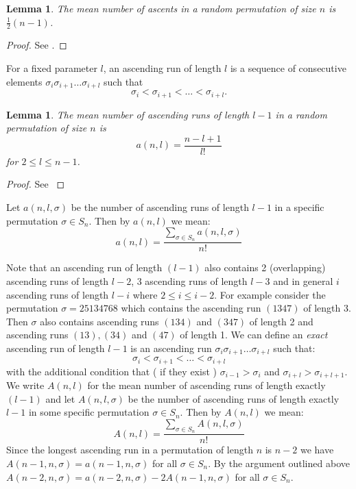\documentclass[oneside]{book} %
\newtheorem{lem}[thm]{Lemma}
\theoremstyle{definition}
\numberwithin{equation}{section}
\begin{document}
\begin{lem}\label{lem:ascents}
 The mean number of ascents in a random permutation of size $n$ is $\frac{1}{2}(n-1)$.
\end{lem}
\begin{proof}
 See \cite{Flajolet}.
\end{proof}

For a fixed parameter $l$, an ascending run of length $l$ is a sequence of consecutive elements 
$\sigma_i\sigma_{i+1}\dots\sigma_{i+l}$ such that 
\[
 \sigma_i < \sigma_{i+1} < \dots < \sigma_{i+l}.
\]

\begin{lem}\label{lem:ascendingruns}
 The mean number of ascending runs of length $l-1$ in a random permutation of size $n$ is 
 \[
  a(n,l) = \frac{n-l+1}{l!}
 \]
for $2 \leq l \leq n-1$.
\end{lem}
\begin{proof}
 See \cite{Flajolet}
\end{proof}
Let $a(n,l,\sigma)$ be the number of ascending runs of length $l-1$ in a specific permutation $\sigma \in S_n$.  Then by $a(n,l)$ we mean:
\[
 a(n,l) = \frac{\sum_{\sigma \in S_n}a(n,l,\sigma)}{n!}
\]


Note that an ascending run of length $(l-1)$ also contains 2 (overlapping) ascending runs of length $l-2$,
3 ascending runs of length $l-3$ and in general $i$ ascending runs of length $l-i$ where $ 2 \leq i\leq i-2 $.   For example consider the permutation $\sigma  = 25134768$ which contains the ascending run $(1347)$ of length 3.  Then $\sigma$ also contains ascending runs $(134)$ and $(347)$ of length 2 and ascending runs $(13),(34)$ and $(47)$ of length 1. We can define an \emph{exact} ascending run of length $l-1$ is an ascending run $\sigma_i\sigma_{i+1}\dots\sigma_{i+l}$ such that:
\[
 \sigma_i < \sigma_{i+1} < \dots < \sigma_{i+l}
\]
with the additional condition that ( if they exist ) $\sigma_{i-1} > \sigma_i$ and $\sigma_{i + l} > \sigma_{i + l + 1}$.  
We write 
$A(n,l)$ for the mean number of ascending runs of length exactly $(l-1)$ and let  
$A(n,l,\sigma)$ be the number of ascending runs of length exactly $l-1$ in some specific permutation $\sigma \in S_n$.  Then 
by $A(n,l)$ we mean:
\[
 A(n,l) = \frac{\sum_{\sigma \in S_n}A(n,l,\sigma)}{n!}
\]
Since the longest ascending run in a permutation of length $n$ is $n-2$ we have $A(n-1,n,\sigma) = a(n-1,n,\sigma)$ for all
$\sigma \in S_n$.  By the argument outlined above $A(n-2,n,\sigma) = a(n-2,n,\sigma) - 2A(n-1,n,\sigma)$ for all 
$\sigma \in S_n$.
\end{document}
